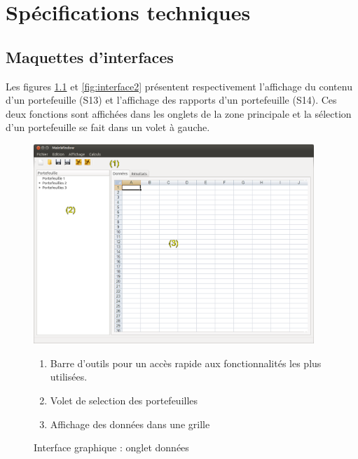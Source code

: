 \documentclass[a4paper]{report}
\begin{document}
\FloatBarrier 





\chapter{Spécifications techniques}

\section{Maquettes d'interfaces}
Les figures \ref{fig:interface} et \ref{fig:interface2} présentent respectivement l'affichage du contenu d'un portefeuille (S13) et l'affichage des rapports d'un portefeuille (S14).
Ces deux fonctions sont affichées dans les onglets de la zone principale et la sélection d'un portefeuille se fait dans un volet à gauche.

	\begin{figure}[H]
		\includegraphics[width=400px]{logicielDonnees.png}
		\caption{Interface graphique : onglet données}
		\label{fig:interface}
		\begin{enumerate}
			\item Barre d’outils pour un accès rapide aux fonctionnalités les plus utilisées.
			\item Volet de selection des portefeuilles
			\item Affichage des données dans une grille 
		\end{enumerate}
	\end{figure}
\end{document}
